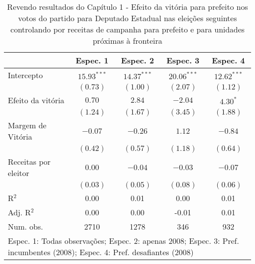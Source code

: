 
\begin{table}
\caption{Revendo resultados do Capítulo 1 - Efeito da vitória para prefeito nos votos do partido para Deputado Estadual nas eleições seguintes controlando por receitas de campanha para prefeito e para unidades próximas à fronteira}
\begin{center}
\begin{tabular}{l c c c c }
\hline
                     & Espec. 1 & Espec. 2 & Espec. 3 & Espec. 4 \\
\hline
Intercepto           & $15.93^{***}$ & $14.37^{***}$ & $20.06^{***}$ & $12.62^{***}$ \\
                     & $(0.73)$      & $(1.00)$      & $(2.07)$      & $(1.12)$      \\
Efeito da vitória    & $0.70$        & $2.84$        & $-2.04$       & $4.30^{*}$    \\
                     & $(1.24)$      & $(1.67)$      & $(3.45)$      & $(1.88)$      \\
Margem de Vitória    & $-0.07$       & $-0.26$       & $1.12$        & $-0.84$       \\
                     & $(0.42)$      & $(0.57)$      & $(1.18)$      & $(0.64)$      \\
Receitas por eleitor & $0.00$        & $-0.04$       & $-0.03$       & $-0.07$       \\
                     & $(0.03)$      & $(0.05)$      & $(0.08)$      & $(0.06)$      \\
\hline
R$^2$                & 0.00          & 0.01          & 0.00          & 0.01          \\
Adj. R$^2$           & 0.00          & 0.00          & -0.01         & 0.01          \\
Num. obs.            & 2710          & 1278          & 346           & 932           \\
\hline
\multicolumn{5}{l}{\scriptsize{Espec. 1: Todas observações; Espec. 2: apenas 2008; Espec. 3: Pref. incumbentes (2008); Espec. 4: Pref. desafiantes (2008)}}
\end{tabular}
\label{tab:c4t2}
\end{center}
\end{table}

